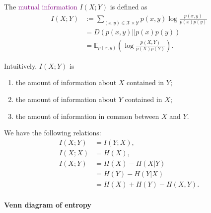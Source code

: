 \documentclass[a4paper, 11pt, openany]{book}
\numberwithin{equation}{section}
\theoremstyle{plain}
\theoremstyle{definition}
\newcommand{\expectation}{\mathbb{E}}
\newcommand{\Define}[1]{\textcolor{purple}{#1}}
\newcommand{\alphabet}[1]{\mathcal{#1}}
\begin{document}
The \Define{mutual information} $I(X;Y)$ is defined as
\begin{align*}
	I(X;Y) &:= \sum_{(x,y) \in \alphabet{X} \times \alphabet{Y}} p(x,y) \log \frac{p(x,y)}{p(x)p(y)}\\
	&= D(p(x,y) || p(x) p(y))\\
	&= \expectation_{p(x,y)} \left( \log \frac{p(X,Y)}{p(X)p(Y)} \right).
\end{align*}

Intuitively, $I(X;Y)$ is
\begin{enumerate}
	\item the amount of information about $X$ contained in $Y$;

	\item the amount of information about $Y$ contained in $X$;
	
	\item the amount of information in common between $X$ and $Y$.
\end{enumerate}


We have the following relations:
\begin{align*}
	I(X;Y) &= I(Y;X),\\
	I(X;X) &= H(X),\\
	I(X;Y) &= H(X) - H(X|Y)\\
	&= H(Y) - H(Y|X)\\
	&= H(X) + H(Y) - H(X,Y).
\end{align*}





\paragraph{Venn diagram of entropy}
\begin{center}
\end{center}
\end{document}
